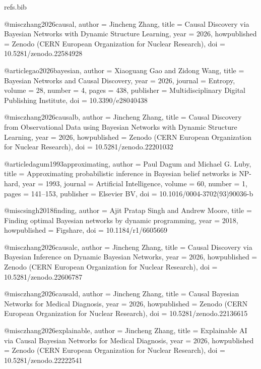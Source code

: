 \begin{filecontents*}[overwrite]{refs.bib}

@misc{zhang2026causal,
  author = {Jincheng Zhang},
  title = {{Causal Discovery via Bayesian Networks with Dynamic Structure Learning}},
  year = {2026},
  howpublished = {Zenodo (CERN European Organization for Nuclear Research)},
  doi = {10.5281/zenodo.22584928}
}

@article{gao2026bayesian,
  author = {Xiaoguang Gao and Zidong Wang},
  title = {{Bayesian Networks and Causal Discovery}},
  year = {2026},
  journal = {Entropy},
  volume = {28},
  number = {4},
  pages = {438},
  publisher = {Multidisciplinary Digital Publishing Institute},
  doi = {10.3390/e28040438}
}

@misc{zhang2026causalb,
  author = {Jincheng Zhang},
  title = {{Causal Discovery from Observational Data using Bayesian Networks with Dynamic Structure Learning}},
  year = {2026},
  howpublished = {Zenodo (CERN European Organization for Nuclear Research)},
  doi = {10.5281/zenodo.22201032}
}

@article{dagum1993approximating,
  author = {Paul Dagum and Michael G. Luby},
  title = {{Approximating probabilistic inference in Bayesian belief networks is NP-hard}},
  year = {1993},
  journal = {Artificial Intelligence},
  volume = {60},
  number = {1},
  pages = {141--153},
  publisher = {Elsevier BV},
  doi = {10.1016/0004-3702(93)90036-b}
}

@misc{singh2018finding,
  author = {Ajit Pratap Singh and Andrew Moore},
  title = {{Finding optimal Bayesian networks by dynamic programming}},
  year = {2018},
  howpublished = {Figshare},
  doi = {10.1184/r1/6605669}
}

@misc{zhang2026causalc,
  author = {Jincheng Zhang},
  title = {{Causal Discovery via Bayesian Inference on Dynamic Bayesian Networks}},
  year = {2026},
  howpublished = {Zenodo (CERN European Organization for Nuclear Research)},
  doi = {10.5281/zenodo.22606787}
}

@misc{zhang2026causald,
  author = {Jincheng Zhang},
  title = {{Causal Bayesian Networks for Medical Diagnosis}},
  year = {2026},
  howpublished = {Zenodo (CERN European Organization for Nuclear Research)},
  doi = {10.5281/zenodo.22136615}
}

@misc{zhang2026explainable,
  author = {Jincheng Zhang},
  title = {{Explainable AI via Causal Bayesian Networks for Medical Diagnosis}},
  year = {2026},
  howpublished = {Zenodo (CERN European Organization for Nuclear Research)},
  doi = {10.5281/zenodo.22222541}
}


\end{filecontents*}

